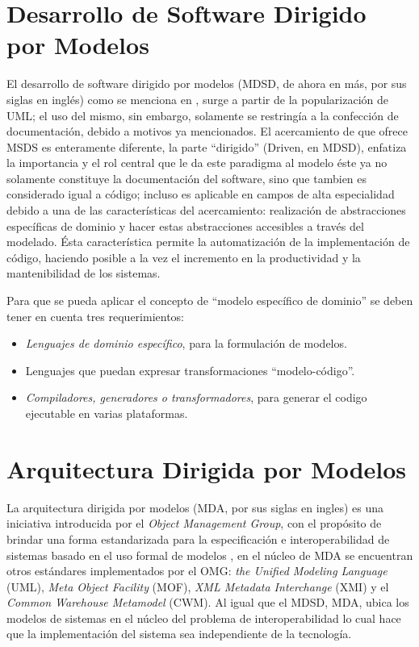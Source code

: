 \section{Desarrollo de Software Dirigido por Modelos}
\label{sec:mdsd}
El desarrollo de software dirigido por modelos (MDSD, de ahora en más, por sus
siglas en inglés) como se menciona en \cite{mdsd} , surge a partir de la
popularización de UML;
el uso del mismo, sin embargo, solamente se restringía a la confección de
documentación, debido a motivos ya mencionados. El acercamiento de que ofrece
MSDS es enteramente diferente, la parte ``dirigido'' (Driven, en MDSD),
enfatiza la importancia y el rol central que le da este paradigma al modelo
éste ya no solamente constituye
la documentación del software, sino que tambien es considerado igual a código;
incluso es aplicable en campos de alta especialidad debido a una de las
características del acercamiento: realización de abstracciones específicas de
dominio y hacer estas abstracciones accesibles a través del modelado. Ésta
característica permite la automatización de la implementación de código,
haciendo posible a la vez el incremento en la productividad y la mantenibilidad
de los sistemas.

Para que se pueda aplicar el concepto de ``modelo específico de dominio'' se
deben tener en cuenta tres requerimientos:
\begin{itemize}
	\item \textit{Lenguajes de dominio específico}, para la formulación de modelos.
	\item Lenguajes que puedan expresar transformaciones ``modelo-código''.
	\item \textit{Compiladores, generadores o transformadores}, para generar el codigo
		ejecutable en varias plataformas.
\end{itemize}

\section{Arquitectura Dirigida por Modelos}
\label{sec:arquitectura_dirigida_por_modelos}
La arquitectura dirigida por modelos (MDA, por sus siglas en ingles) es una
iniciativa introducida por el \textit{Object Management Group}, con el propósito de
brindar una forma estandarizada para la especificación e interoperabilidad de
sistemas basado en el uso formal de modelos \cite{poole2001}, en el núcleo de
MDA se encuentran otros estándares implementados por el OMG: \textit{the Unified
Modeling Language} (UML), \textit{Meta Object Facility} (MOF), \textit{XML
Metadata Interchange}
(XMI) y el \textit{Common Warehouse Metamodel} (CWM). Al igual que el MDSD, MDA, ubica
los modelos de sistemas en el núcleo del problema de interoperabilidad lo cual
hace que la implementación del sistema sea independiente de la tecnología.

